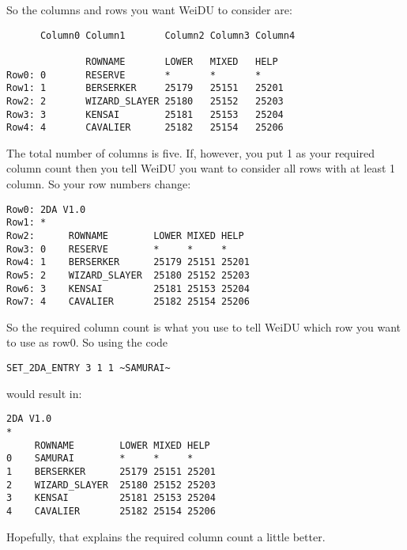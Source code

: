 \documentclass{article}
\begin{document}
So the columns and rows you want WeiDU to consider are:

\begin{verbatim}
      Column0 Column1       Column2 Column3 Column4

              ROWNAME       LOWER   MIXED   HELP
Row0: 0       RESERVE       *       *       *
Row1: 1       BERSERKER     25179   25151   25201
Row2: 2       WIZARD_SLAYER 25180   25152   25203
Row3: 3       KENSAI        25181   25153   25204
Row4: 4       CAVALIER      25182   25154   25206
\end{verbatim}

The total number of columns is five. If, however, you put 1 as your
required column count then you tell WeiDU you want to consider all rows
with at least 1 column. So your row numbers change:

\begin{verbatim}
Row0: 2DA V1.0
Row1: *
Row2:      ROWNAME        LOWER MIXED HELP
Row3: 0    RESERVE        *     *     *
Row4: 1    BERSERKER      25179 25151 25201
Row5: 2    WIZARD_SLAYER  25180 25152 25203
Row6: 3    KENSAI         25181 25153 25204
Row7: 4    CAVALIER       25182 25154 25206
\end{verbatim}

So the required column count is what you use to tell WeiDU which row you
want to use as row0. So using the code 
\begin{verbatim}
SET_2DA_ENTRY 3 1 1 ~SAMURAI~
\end{verbatim}
would result in:

\begin{verbatim}
2DA V1.0
*
     ROWNAME        LOWER MIXED HELP
0    SAMURAI        *     *     *
1    BERSERKER      25179 25151 25201
2    WIZARD_SLAYER  25180 25152 25203
3    KENSAI         25181 25153 25204
4    CAVALIER       25182 25154 25206
\end{verbatim}

Hopefully, that explains the required column count a little better.
\end{document}
